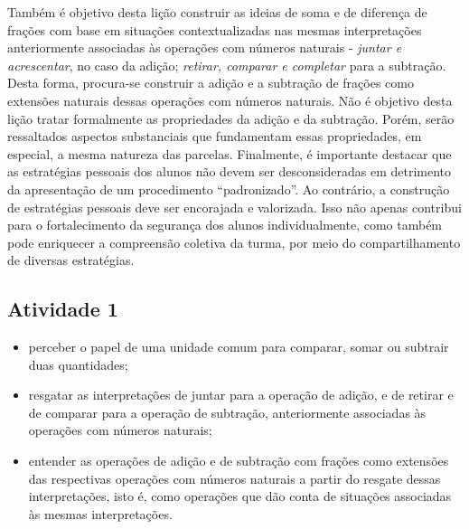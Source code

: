   Também é objetivo desta lição construir as ideias de soma e de diferença de frações com base em situações contextualizadas nas mesmas interpretações anteriormente associadas às operações com números naturais -   {\it juntar e acrescentar}, no caso da adição;    {\it retirar, comparar e completar}   para a subtração. Desta forma, procura-se construir a adição e a subtração de frações como extensões naturais dessas operações com números naturais. Não é objetivo desta lição tratar formalmente as propriedades da adição e da subtração. Porém, serão ressaltados aspectos substanciais que fundamentam essas propriedades, em especial, a mesma natureza das parcelas.
  Finalmente, é importante destacar que as estratégias pessoais dos alunos não devem ser desconsideradas em detrimento da apresentação de um procedimento   ``padronizado''. Ao contrário, a construção de estratégias pessoais deve ser encorajada e valorizada. Isso não apenas contribui para o fortalecimento da segurança dos alunos individualmente, como também pode enriquecer a compreensão coletiva da turma, por meio do compartilhamento de diversas estratégias.



\subsection{Atividade 1}

\vspace{.15cm}

\begin{itemize} %
  \item     perceber o papel de uma unidade comum para comparar, somar ou subtrair duas quantidades;
  \item     resgatar as interpretações de juntar para a operação de adição, e de retirar e de comparar para a operação de subtração, anteriormente associadas às operações com números naturais;
  \item     entender as operações de adição e de subtração com frações como extensões das respectivas operações com números naturais a partir do resgate dessas interpretações, isto é, como operações que dão conta de situações associadas às mesmas interpretações.
\end{itemize} %


